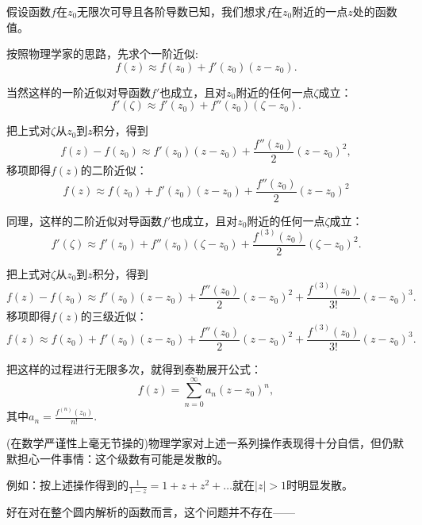 \documentclass[CJK]{beamer}
\begin{document}
\begin{frame}
  \bch
  假设函数$f$在$z_0$无限次可导且各阶导数已知，我们想求$f$在$z_0$附近的一点$z$处的函数值。


  \skiplines
  
  按照物理学家的思路，先求个一阶近似:
  \begin{equation}
    f(z) \approx f(z_0) + f'(z_0)(z-z_0). \nonumber
  \end{equation}
  
  \ech
\end{frame}

\begin{frame}
  \bch
  当然这样的一阶近似对导函数$f'$也成立，且对$z_0$附近的任何一点$\zeta$成立：
$$    f'(\zeta) \approx f'(z_0) + f''(z_0)(\zeta-z_0).  $$

  把上式对$\zeta$从$z_0$到$z$积分，得到
  $$     f(z) - f(z_0) \approx f'(z_0)(z-z_0) + \frac{f''(z_0)}{2} (z-z_0)^2 ,$$
  移项即得$f(z)$的二阶近似：
  \begin{equation}
    f(z) \approx f(z_0)  + f'(z_0)(z-z_0) + \frac{f''(z_0)}{2} (z-z_0)^2 \nonumber
  \end{equation}
  
  \ech
\end{frame}


\begin{frame}
  \bch
  同理，这样的二阶近似对导函数$f'$也成立，且对$z_0$附近的任何一点$\zeta$成立：
$$    f'(\zeta) \approx f'(z_0) + f''(z_0)(\zeta-z_0) + \frac{f^{(3)}(z_0)}{2} (\zeta - z_0)^2.  $$

  把上式对$\zeta$从$z_0$到$z$积分，得到
  $$     f(z) - f(z_0)  \approx  f'(z_0)(z-z_0) + \frac{f''(z_0)}{2} (z-z_0)^2 + \frac{f^{(3)}(z_0)}{3!}(z-z_0)^3. $$
  移项即得$f(z)$的三级近似：
  \begin{equation}
    f(z)  \approx f(z_0) + f'(z_0)(z-z_0) + \frac{f''(z_0)}{2} (z-z_0)^2 + \frac{f^{(3)}(z_0)}{3!}(z-z_0)^3. \nonumber
  \end{equation}
  
  \ech
\end{frame}


\begin{frame}
  \bch
  把这样的过程进行无限多次，就得到{\blue 泰勒展开公式：
  $$f(z) = \sum_{n=0}^\infty a_n(z-z_0)^n,$$
  其中$a_n = \frac{f^{(n)}(z_0)}{n!}$.}

  \skiplines

  (在数学严谨性上毫无节操的)物理学家对上述一系列操作表现得十分自信，但仍默默担心一件事情：这个级数有可能是发散的。

  例如：按上述操作得到的$\frac{1}{1-z} = 1+z+z^2+\ldots$就在$|z|>1$时明显发散。

  \skiplines
  
  好在对在整个圆内解析的函数而言，这个问题并不存在——
  \ech
\end{frame}
\end{document}
